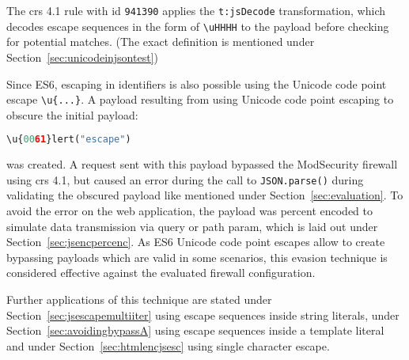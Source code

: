 The \acrshort{crs} 4.1 rule with id \verb|941390| applies the \verb|t:jsDecode| transformation, which decodes escape sequences in the form of \verb|\uHHHH| to the payload before checking for potential matches. \cite{modsec/transjsdecode} (The exact definition is mentioned under Section~\ref{sec:unicodeinjsontest})

Since ES6, escaping in identifiers is also possible using the Unicode code point escape \verb|\u{...}|. A payload resulting from using Unicode code point escaping to obscure the initial payload:

\begin{lstlisting}[style=basicStyle, language=Python]
\u{0061}lert("escape")
\end{lstlisting}

was created. A request sent with this payload bypassed the ModSecurity firewall using \acrshort{crs} 4.1, but caused an error during the call to \verb|JSON.parse()| during validating the obscured payload like mentioned under Section~\ref{sec:evaluation}. 
To avoid the error on the web application, the payload was percent encoded to simulate data transmission via query or path param, which is laid out under Section~\ref{sec:jsencpercenc}. As ES6 Unicode code point escapes allow to create bypassing payloads which are valid in some scenarios, this evasion technique is considered effective against the evaluated firewall configuration.

Further applications of this technique are stated under Section~\ref{sec:jsescapemultiiter} using escape sequences inside string literals, under Section~\ref{sec:avoidingbypassA} using escape sequences inside a template literal and under Section~\ref{sec:htmlencjsesc} using single character escape.

%
%
%

